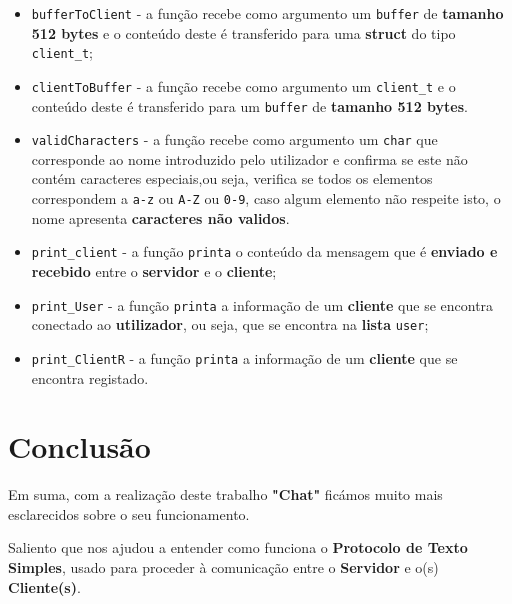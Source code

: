 \documentclass[11pt]{article}   %
\begin{document}
\begin{itemize}
    \item \verb|bufferToClient| - a função recebe como argumento um \verb|buffer| de 
    \textbf{tamanho 512 bytes} e o conteúdo deste é transferido para uma \textbf{struct} do 
    tipo \verb|client_t|;
    \item \verb|clientToBuffer| - a função recebe como argumento um \verb|client_t| e o
    conteúdo deste é transferido para um \verb|buffer| de \textbf{tamanho 512 bytes}.
    \item \verb|validCharacters| - a função recebe como argumento um \verb|char| que corresponde
    ao nome introduzido pelo utilizador e confirma se este não contém caracteres especiais,ou seja,
    verifica se todos os elementos correspondem a \verb|a-z| ou \verb|A-Z| ou \verb|0-9|, caso 
    algum elemento não respeite isto, o nome apresenta \textbf{caracteres não validos}.
    \item \verb|print_client| - a função \verb|printa| o conteúdo da mensagem que é 
    \textbf{enviado e recebido} entre o \textbf{servidor} e o \textbf{cliente};
    \item \verb|print_User| - a função \verb|printa| a informação de um \textbf{cliente}
    que se encontra conectado ao \textbf{utilizador}, ou seja, que se encontra na 
    \textbf{lista} \verb|user|;
    \item \verb|print_ClientR| - a função \verb|printa| a informação de um \textbf{cliente}
    que se encontra registado.
\end{itemize}
\section{Conclusão} %
\hspace{0,5cm}Em suma, com a realização deste trabalho \textbf{"Chat"} ficámos muito 
mais esclarecidos sobre o seu funcionamento. \par
Saliento que nos ajudou a entender como funciona o \textbf{Protocolo de Texto Simples}, 
usado para proceder à comunicação entre o \textbf{Servidor} e o(s) \textbf{Cliente(s)}. 

\end{document}
